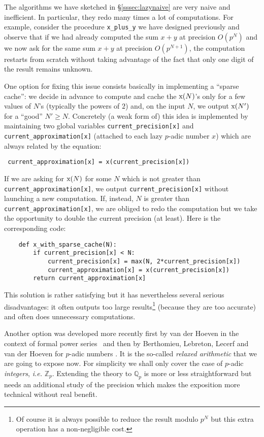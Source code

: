\documentclass[11pt]{article}
\numberwithin{equation}{section}
\numberwithin{figure}{section}
\renewcommand{\geq}{\geqslant}
\theoremstyle{definition}
\newcommand{\Z}{\mathbb Z}
\newcommand{\Zp}{\Z_p}
\newcommand{\Q}{\mathbb Q}
\newcommand{\Qp}{\Q_p}
\newcommand{\ttx}{\texttt{\rm x}\xspace}
\begin{document}
The algorithms we have sketched in \S\ref{sssec:lazynaive} are very 
naive and inefficient. In particular, they redo many times a lot of 
computations. For example, consider the procedure \texttt{x\_plus\_y} we 
have designed previously and observe that if we had already computed the 
sum $x + y$ at precision $O(p^N)$ and we now ask for the same sum $x + 
y$ at precision $O(p^{N+1})$, the computation restarts from scratch 
without taking advantage of the fact that only one digit of the result 
remains unknown.

One option for fixing this issue consists basically in implementing a 
``sparse cache'': we decide in advance to compute and cache the 
$\ttx(N)$'s only for a few values of $N$'s (typically the powers of $2$) 
and, on the input $N$, we output $\ttx(N')$ for a ``good'' $N' \geq N$. 
Concretely (a weak form of) this idea is implemented by maintaining two 
global variables \texttt{current\_precision[x]} and 
\texttt{current\_approximation[x]} (attached to each lazy $p$-adic 
number $x$) which are always related by the equation:
\begin{center}
\tt
current\_approximation[x] = x(current\_precision[x])
\end{center}
If we are asking for $\ttx(N)$ for some $N$ which is not greater than 
\texttt{current\_approximation[x]}, we output 
\texttt{current\_precision[x]} without launching a new computation. 
If, instead, $N$ is greater than \texttt{current\_approximation[x]}, we are 
obliged to redo the computation but we take the opportunity to double
the current precision (at least). Here is the corresponding code:

\begin{lstlisting}
    def x_with_sparse_cache(N):
        if current_precision[x] < N:
            current_precision[x] = max(N, 2*current_precision[x])
            current_approximation[x] = x(current_precision[x])
        return current_approximation[x]
\end{lstlisting}

\noindent
This solution is rather satisfying but it has nevertheless several 
serious disadvantages: it often outputs too large results\footnote{Of 
course it is always possible to reduce the result modulo $p^N$ but this 
extra operation has a non-negligible cost.} (because they are too 
accurate) and often does unnecessary computations.

Another option was developed more recently first by van der Hoeven in 
the context of formal power series~\cite{Ho97,Ho02,Ho07} and then by 
Berthomieu, Lebreton, Lecerf and van der Hoeven for $p$-adic numbers 
\cite{BeHoLe11,BeLe12,Le13}. It is the so-called \emph{relaxed 
arithmetic} that we are going to expose now. For simplicity we shall 
only cover the case of $p$-adic \emph{integers}, \emph{i.e.} $\Zp$. 
Extending the theory to $\Qp$ is more or less straightforward but needs 
an additional study of the precision which makes the exposition more 
technical without real benefit.
\end{document}
